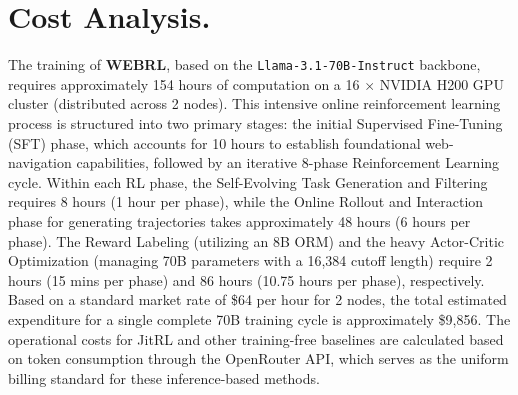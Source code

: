 \section{Cost Analysis.}
\label{app:cost}
The training of \textbf{WEBRL}, based on the \texttt{Llama-3.1-70B-Instruct} backbone, requires approximately 154 hours of computation on a 16 $\times$ NVIDIA H200 GPU cluster (distributed across 2 nodes). This intensive online reinforcement learning process is structured into two primary stages: the initial Supervised Fine-Tuning (SFT) phase, which accounts for 10 hours to establish foundational web-navigation capabilities, followed by an iterative 8-phase Reinforcement Learning cycle. Within each RL phase, the Self-Evolving Task Generation and Filtering requires 8 hours (1 hour per phase), while the Online Rollout and Interaction phase for generating trajectories takes approximately 48 hours (6 hours per phase). The Reward Labeling (utilizing an 8B ORM) and the heavy Actor-Critic Optimization (managing 70B parameters with a 16,384 cutoff length) require 2 hours (15 mins per phase) and 86 hours (10.75 hours per phase), respectively. Based on a standard market rate of \$64 per hour for 2 nodes, the total estimated expenditure for a single complete 70B training cycle is approximately \$9,856.
The operational costs for JitRL and other training-free baselines are calculated based on token consumption through the OpenRouter API, which serves as the uniform billing standard for these inference-based methods.